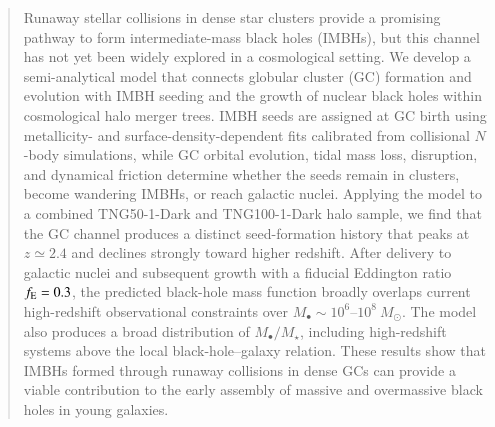 \documentclass[trackchanges, twocolappendix, twocolumn]{aastex701}
\begin{document}
\begin{CJK*}{UTF8}{gbsn}
\author[0009-0003-9099-5805,gname=Chuizheng,sname=Kong]{Chuizheng Kong (孔垂政)}

\author[0000-0002-1253-2763,gname=Hui,sname=Li]{Hui Li (李辉)}

\begin{abstract}

Runaway stellar collisions in dense star clusters provide a promising pathway to form intermediate-mass black holes (IMBHs), but this channel has not yet been widely explored in a cosmological setting. We develop a semi-analytical model that connects globular cluster (GC) formation and evolution with IMBH seeding and the growth of nuclear black holes within cosmological halo merger trees. IMBH seeds are assigned at GC birth using metallicity- and surface-density-dependent fits calibrated from collisional $N$-body simulations, while GC orbital evolution, tidal mass loss, disruption, and dynamical friction determine whether the seeds remain in clusters, become wandering IMBHs, or reach galactic nuclei. Applying the model to a combined TNG50-1-Dark and TNG100-1-Dark halo sample, we find that the GC channel produces a distinct seed-formation history that peaks at $z \simeq 2.4$ and declines strongly toward higher redshift. After delivery to galactic nuclei and subsequent growth with a fiducial Eddington ratio $f_{\rm E}=0.3$, the predicted black-hole mass function broadly overlaps current high-redshift observational constraints over $M_\bullet \sim 10^6$--$10^8~M_\odot$. The model also produces a broad distribution of $M_\bullet/M_\star$, including high-redshift systems above the local black-hole--galaxy relation. These results show that IMBHs formed through runaway collisions in dense GCs can provide a viable contribution to the early assembly of massive and overmassive black holes in young galaxies.

\end{abstract}


\end{CJK*}
\end{document}
